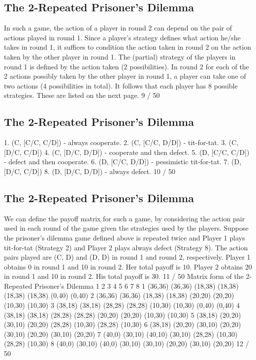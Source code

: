 \documentclass[]{report}
\begin{document}
\subsection{The 2-Repeated Prisoner’s Dilemma}
In such a game, the action of a player in round 2 can depend on
the pair of actions played in round 1.
Since a player’s strategy defines what action he/she takes in round
1, it suffices to condition the action taken in round 2 on the action
taken by the other player in round 1.
The (partial) strategy of the players in round 1 is defined by the
action taken (2 possibilities). In round 2 for each of the 2 actions
possibly taken by the other player in round 1, a player can take one
of two actions (4 possibilities in total).
It follows that each player has 8 possible strategies. These are
listed on the next page.
9 / 50
\subsection{The 2-Repeated Prisoner’s Dilemma}
1. (C, [C/C, C/D]) - always cooperate.
2. (C, [C/C, D/D]) - tit-for-tat.
3. (C, [D/C, C/D])
4. (C, [D/C, D/D]) - cooperate and then defect.
5. (D, [C/C, C/D]) - defect and then cooperate.
6. (D, [C/C, D/D]) - pessimistic tit-for-tat.
7. (D, [D/C, C/D])
8. (D, [D/C, D/D]) - always defect.
10 / 50
\subsection{The 2-Repeated Prisoner’s Dilemma}
We can define the payoff matrix for such a game, by considering
the action pair used in each round of the game given the strategies
used by the players.
Suppose the prisoner’s dilemma game defined above is repeated
twice and Player 1 plays tit-for-tat (Strategy 2) and Player 2 plays
always defect (Strategy 8).
The action pairs played are (C, D) and (D, D) in round 1 and
round 2, respectively.
Player 1 obtains 0 in round 1 and 10 in round 2. Her total payoff is
10.
Player 2 obtains 20 in round 1 and 10 in round 2. His total payoff
is 30.
11 / 50
Matrix form of the 2-Repeated Prisoner’s Dilemma
1 2 3 4 5 6 7 8
1 (36,36) (36,36) (18,38) (18,38) (18,38) (18,38) (0,40) (0,40)
2 (36,36) (36,36) (18,38) (18,38) (20,20) (20,20) (10,30) (10,30)
3 (38,18) (38,18) (28,28) (28,28) (10,30) (10,30) (0,40) (0,40)
4 (38,18) (38,18) (28,28) (28,28) (20,20) (20,20) (10,30) (10,30)
5 (38,18) (20,20) (30,10) (20,20) (28,28) (10,30) (28,28) (10,30)
6 (38,18) (20,20) (30,10) (20,20) (30,10) (20,20) (30,10) (20,20)
7 (40,0) (30,10) (40,10) (30,10) (28,28) (10,30) (28,28) (10,30)
8 (40,0) (30,10) (40,0) (30,10) (30,10) (20,20) (30,10) (20,20)
12 / 50
\end{document}
